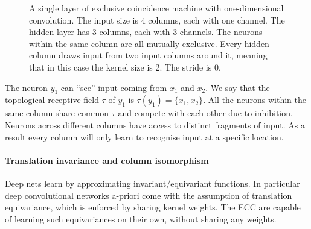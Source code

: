\documentclass[12pt]{article}
\begin{document}
\begin{figure}[!htbp]
	\caption{A single layer of exclusive coincidence machine with one-dimensional convolution. The input size is $4$ columns, each with one channel. The hidden layer has $3$ columns, each with $3$ channels. The neurons within the same column are all mutually exclusive. Every hidden column draws input from two input columns around it, meaning that in this case the kernel size is $2$. The stride is $0$. }
	\label{fig:ecc_conv_machine}
\end{figure} 

The neuron $y_1$ can ``see'' input coming from $x_1$ and $x_2$. We say that the topological receptive field $\tau$ of $y_1$ is $\tau(y_1)=\{x_1,x_2\}$. All the neurons
within the same column share common $\tau$ and compete with each other due to inhibition. Neurons across different columns have access to distinct fragments of input. As a result every column will only learn to recognise input at a specific location. 

\paragraph{Translation invariance and column isomorphism}  Deep nets learn by approximating invariant/equivariant functions. In particular deep convolutional networks a-priori come with the assumption of translation equivariance, which is enforced by sharing kernel weights. The ECC are capable of learning such equivariances on their own, without sharing any weights.
\end{document}
